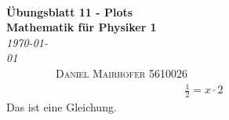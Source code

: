 \documentclass[10pt]{article}
\begin{document}
{\noindent\Huge\bf  \\[0.5\baselineskip] {\selectfont  Übungsblatt 11 - Plots}         }\\[2\baselineskip] %
{ {\bf {}\selectfont Mathematik für Physiker 1}\\ {\textit{\selectfont \today   }}}~~~~~~~~~~~~~~~~~~~~~~~~~~~~~~~~~~~~~~~~~~~~~~~~~~~~~~~~~~~~~~~~~~~~~~~~~~~~~\
{\textsc{Daniel Mairhofer 5610026}}%
\\[1.4\baselineskip] 
    
\begin{align}
                \frac 12 = x \cdot 2
\end{align}
Das ist eine Gleichung.
\end{document}
